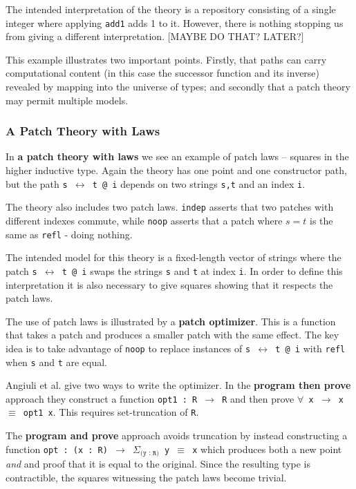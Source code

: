 The intended interpretation of the theory is a repository consisting of a single
integer where applying \texttt{add1} adds 1 to it. However, there is nothing
stopping us from giving a different interpretation. [MAYBE DO THAT? LATER?]

This example illustrates two important points. Firstly, that paths can carry
computational content (in this case the successor function and its inverse)
revealed by mapping into the universe of types; and secondly that a
patch theory may permit multiple models.

\subsubsection{A Patch Theory with Laws}

In \textbf{a patch theory with laws} we see an example of patch laws -- squares
in the higher inductive type. Again the theory has one point and one constructor
path, but the path \texttt{s $\leftrightarrow$ t @ i} depends on two
strings \texttt{s,t} and an index \texttt{i}.

The theory also includes two patch laws. \texttt{indep} asserts that two patches
with different indexes commute, while \texttt{noop} asserts that a patch where
$s = t$ is the same as \texttt{refl} - doing nothing.

The intended model for this theory is a fixed-length vector of strings where the
patch \texttt{s $\leftrightarrow$ t @ i} swaps the strings \texttt{s} and
\texttt{t} at index \texttt{i}. In order to define this interpretation it is
also necessary to give squares showing that it respects the patch laws.

The use of patch laws is illustrated by a \textbf{patch optimizer}. This is a
function that takes a patch and produces a smaller patch with the same effect.
The key idea is to take advantage of \texttt{noop} to replace instances of
\texttt{s $\leftrightarrow$ t @ i} with \texttt{refl} when \texttt{s} and
\texttt{t} are equal.

Angiuli et al. give two ways to write the optimizer. In the \textbf{program then
  prove} approach they construct a function \texttt{opt1 : R $\rightarrow$ R}
and then prove \texttt{$\forall$ x $\rightarrow$ x $\equiv$ opt1 x}. This
requires set-truncation of \texttt{R}.

The \textbf{program and prove} approach avoids truncation by instead
constructing a function \texttt{opt : (x : R) $\rightarrow$ $\Sigma_\texttt{(y :
    R)}$ y $\equiv$ x} which produces both a new point \emph{and} and proof that
it is equal to the original. Since the resulting type is contractible, the
squares witnessing the patch laws become trivial.


